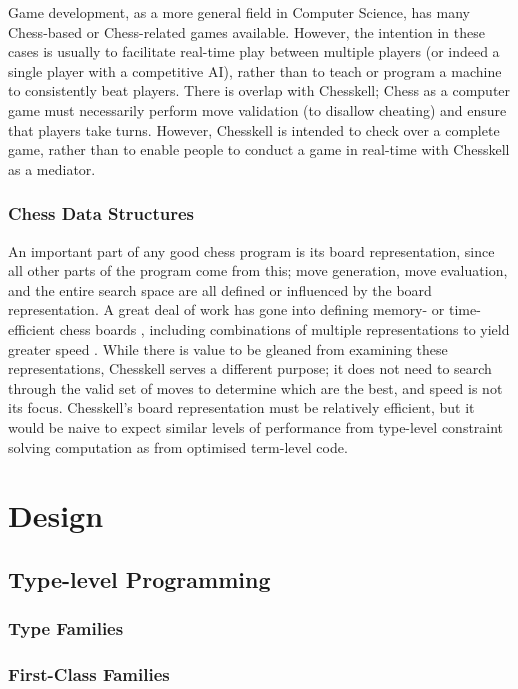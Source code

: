 \documentclass[12pt, a4paper, bibliography=totocnumbered]{scrreprt}
\begin{document}
Game development, as a more general field in Computer Science, has many Chess-based or Chess-related games available. However, the intention in these cases is usually to facilitate real-time play between multiple players (or indeed a single player with a competitive AI), rather than to teach or program a machine to consistently beat players. There is overlap with Chesskell; Chess as a computer game must necessarily perform move validation (to disallow cheating) and ensure that players take turns. However, Chesskell is intended to check over a complete game, rather than to enable people to conduct a game in real-time with Chesskell as a mediator.

\section{Chess Data Structures}

An important part of any good chess program is its board representation, since all other parts of the program come from this; move generation, move evaluation, and the entire search space are all defined or influenced by the board representation. A great deal of work has gone into defining memory- or time-efficient chess boards \cite{bitboard} \cite{searchtables}, including combinations of multiple representations to yield greater speed \cite{bitandccr}. While there is value to be gleaned from examining these representations, Chesskell serves a different purpose; it does not need to search through the valid set of moves to determine which are the best, and speed is not its focus. Chesskell's board representation must be relatively efficient, but it would be naive to expect similar levels of performance from type-level constraint solving computation as from optimised term-level code.


\part{Design}

\chapter{Type-level Programming}

\section{Type Families}

\section{First-Class Families}
\end{document}
